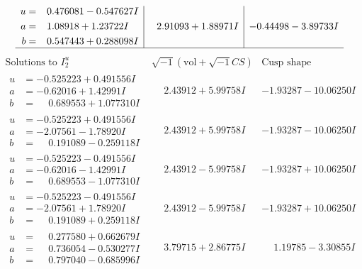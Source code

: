 \documentclass[1p]{elsarticle_modified}
\theoremstyle{definition}
\newcommand{\I}{\sqrt{-1}}
\begin{document}
$$\begin{array}{c|c|c}
\begin{aligned}
u &= \phantom{-}0.476081 - 0.547627 I \\
a &= \phantom{-}1.08918 + 1.23722 I \\
b &= \phantom{-}0.547443 + 0.288098 I\end{aligned}
 & \phantom{-}2.91093 + 1.88971 I & -0.44498 - 3.89733 I\\
 \hline 
 \end{array}$$\newpage$$\begin{array}{c|c|c}  
\text{Solutions to }I^u_{2}& \I (\text{vol} + \sqrt{-1}CS) & \text{Cusp shape}\\
 \hline 
\begin{aligned}
u &= -0.525223 + 0.491556 I \\
a &= -0.62016 + 1.42991 I \\
b &= \phantom{-}0.689553 + 1.077310 I\end{aligned}
 & \phantom{-}2.43912 + 5.99758 I & -1.93287 - 10.06250 I \\ \hline\begin{aligned}
u &= -0.525223 + 0.491556 I \\
a &= -2.07561 - 1.78920 I \\
b &= \phantom{-}0.191089 - 0.259118 I\end{aligned}
 & \phantom{-}2.43912 + 5.99758 I & -1.93287 - 10.06250 I \\ \hline\begin{aligned}
u &= -0.525223 - 0.491556 I \\
a &= -0.62016 - 1.42991 I \\
b &= \phantom{-}0.689553 - 1.077310 I\end{aligned}
 & \phantom{-}2.43912 - 5.99758 I & -1.93287 + 10.06250 I \\ \hline\begin{aligned}
u &= -0.525223 - 0.491556 I \\
a &= -2.07561 + 1.78920 I \\
b &= \phantom{-}0.191089 + 0.259118 I\end{aligned}
 & \phantom{-}2.43912 - 5.99758 I & -1.93287 + 10.06250 I \\ \hline\begin{aligned}
u &= \phantom{-}0.277580 + 0.662679 I \\
a &= \phantom{-}0.736054 - 0.530277 I \\
b &= \phantom{-}0.797040 - 0.685996 I\end{aligned}
 & \phantom{-}3.79715 + 2.86775 I & \phantom{-}1.19785 - 3.30855 I \\ \hline\begin{aligned}

\end{aligned}
\end{array}$$
\end{document}
